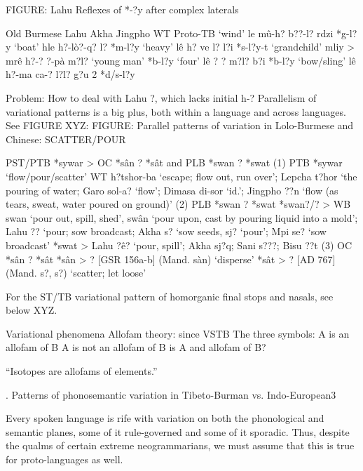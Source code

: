 	FIGURE:  Lahu Reflexes of *-?y after complex laterals

		Old Burmese	Lahu		Akha	Jingpho		WT	Proto-TB
‘wind’		le		mû-h?			b??-l?		rdzi	*g-l?y
‘boat’		hle		h?-lò?-q?		l?			*m-l?y
‘heavy’		lê		h? ve			l?		l?i	*s-l?y-t
‘grandchild’	mliy > mrê	h?-?		?-pà	m?l? ‘young man’	*b-l?y
‘four’		lê		?		?	m?l?		b?i	*b-l?y
‘bow/sling’	lê		h?-ma		ca-?	l?l?		g?u 2	*d/s-l?y

Problem: How to deal with Lahu ?, which lacks initial h-?
Parallelism of variational patterns is a big plus, both within a language and across languages.  See FIGURE XYZ:
	FIGURE:  Parallel patterns of variation in Lolo-Burmese and Chinese: SCATTER/POUR

			PST/PTB *sywar > OC *sân  ?  *sât  and PLB *swan  ? *swat
(1) PTB *sywar ‘flow/pour/scatter’
	WT h?tshor-ba ‘escape; flow out, run over’; Lepcha t?hor ‘the pouring of water; Garo sol-a?
	‘flow’; Dimasa di-sor ‘id.’; Jingpho ??n ‘flow (as tears, sweat, water poured on ground)’
(2) PLB *swan  ? *swat
	*swan?/?  > WB swan ‘pour out, spill, shed’, swân ‘pour upon, cast by pouring liquid into a
	mold’; Lahu ?? ‘pour; sow broadcast; Akha s? ‘sow seeds, sj? ‘pour’; Mpi se? ‘sow broadcast’
	*swat	>    Lahu ?ê? ‘pour, spill’; Akha sj?q; Sani s???; Bisu ??t
(3) OC  *sân  ?  *sât
	*sân  >  ?  [GSR 156a-b] (Mand. sàn) ‘disperse’
	*sât   >  ?   [AD 767]  (Mand. s?, s?)  ‘scatter; let loose’

For the ST/TB variational pattern of homorganic final stops and nasals, see below XYZ.


Variational phenomena
Allofam theory: since VSTB
	The three symbols: 	A is an allofam of B
				A is not an allofam of B
				is A and allofam of B?

“Isotopes are allofams of elements.”


. Patterns of phonosemantic variation in Tibeto-Burman vs. Indo-European3

Every spoken language is rife with variation on both the phonological and semantic planes, some of it rule-governed and some of it sporadic. Thus, despite the qualms of certain extreme neogrammarians, we must assume that this is true for proto-languages as well. 

